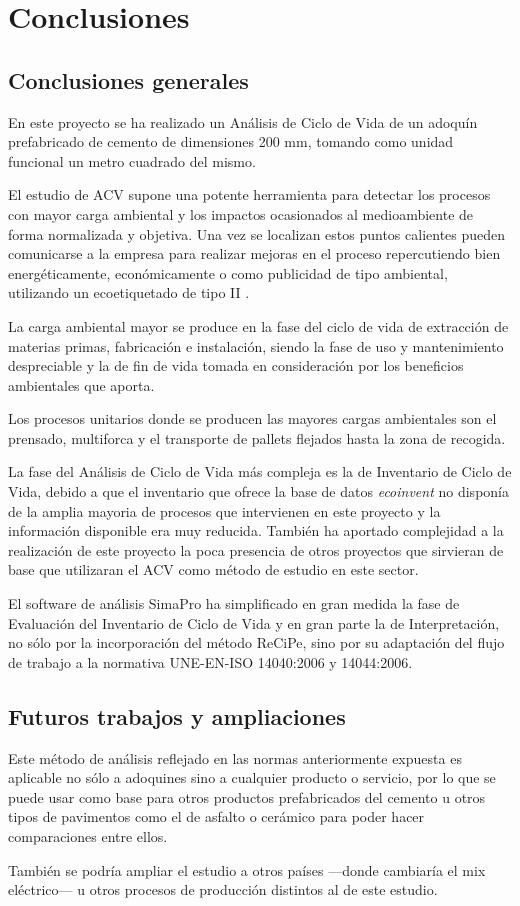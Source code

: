 \chapter{Conclusiones}\label{cap:conclusiones}
\section{Conclusiones generales}
En este proyecto se ha realizado un Análisis de Ciclo de Vida de un adoquín prefabricado de cemento de dimensiones 200 \si{mm}, tomando como unidad funcional un metro cuadrado del mismo.

El estudio de ACV supone una potente herramienta para detectar los procesos con mayor carga ambiental y los impactos ocasionados al medioambiente de forma normalizada y objetiva. Una vez se localizan estos puntos calientes pueden comunicarse a la empresa para realizar mejoras en el proceso repercutiendo bien energéticamente, económicamente o como publicidad de tipo ambiental, utilizando un ecoetiquetado de tipo II \cite{iso14021}.

La carga ambiental mayor se produce en la fase del ciclo de vida de extracción de materias primas, fabricación e instalación, siendo la fase de uso y mantenimiento despreciable y la de fin de vida tomada en consideración por los beneficios ambientales que aporta.

Los procesos unitarios donde se producen las mayores cargas ambientales son el prensado, multiforca y el transporte de pallets flejados hasta la zona de recogida.

La fase del Análisis de Ciclo de Vida más compleja es la de Inventario de Ciclo de Vida, debido a que el inventario que ofrece la base de datos \textit{ecoinvent} no disponía de la amplia mayoria de procesos que intervienen en este proyecto y la información disponible era muy reducida. También ha aportado complejidad a la realización de este proyecto la poca presencia de otros proyectos que sirvieran de base que utilizaran el ACV como método de estudio en este sector.

El software de análisis SimaPro ha simplificado en gran medida la fase de Evaluación del Inventario de Ciclo de Vida y en gran parte la de Interpretación, no sólo por la incorporación del método ReCiPe, sino por su adaptación del flujo de trabajo a la normativa UNE-EN-ISO 14040:2006 y 14044:2006.


\section{Futuros trabajos y ampliaciones}

Este método de análisis reflejado en las normas anteriormente expuesta es aplicable no sólo a adoquines sino a cualquier producto o servicio, por lo que se puede usar como base para otros productos prefabricados del cemento u otros tipos de pavimentos como el de asfalto o cerámico para poder hacer comparaciones entre ellos.

También se podría ampliar el estudio a otros países —donde cambiaría el mix eléctrico— u otros procesos de producción distintos al de este estudio.
